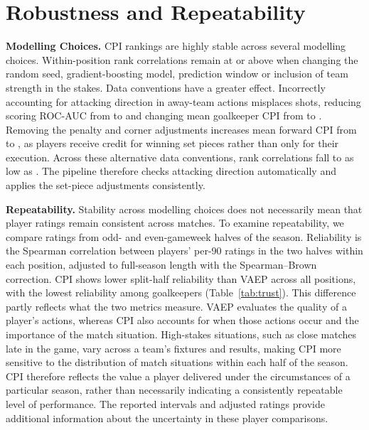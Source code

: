 \documentclass[runningheads]{llncs}
\begin{document}
\section{Robustness and Repeatability}
\label{sec:robust}
\noindent\textbf{Modelling Choices.} CPI rankings are highly stable across several modelling choices. Within-position rank correlations remain at or above \sensRhoMin{} when changing the random seed, gradient-boosting model, prediction window or inclusion of team strength in the stakes. Data conventions have a greater effect. Incorrectly accounting for attacking direction in away-team actions misplaces shots, reducing scoring ROC-AUC from \baseAuc{} to \mirrorAuc{} and changing mean goalkeeper CPI from \baseKeeper{} to \mirrorKeeper{}. Removing the penalty and corner adjustments increases mean forward CPI from \baseForward{} to \noBaseForward{}, as players receive credit for winning set pieces rather than only for their execution. Across these alternative data conventions, rank correlations fall to as low as \choiceRhoMin{}. The pipeline therefore checks attacking direction automatically and applies the set-piece adjustments consistently.

\textbf{Repeatability.} Stability across modelling choices does not necessarily mean that player ratings remain consistent across matches. To examine repeatability, we compare ratings from odd- and even-gameweek halves of the season. Reliability is the Spearman correlation between players' per-90 ratings in the two halves within each position, adjusted to full-season length with the Spearman--Brown correction. CPI shows lower split-half reliability than VAEP across all positions, with the lowest reliability among goalkeepers (Table~\ref{tab:trust}). This difference partly reflects what the two metrics measure. VAEP evaluates the quality of a player's actions, whereas CPI also accounts for when those actions occur and the importance of the match situation. High-stakes situations, such as close matches late in the game, vary across a team's fixtures and results, making CPI more sensitive to the distribution of match situations within each half of the season. CPI therefore reflects the value a player delivered under the circumstances of a particular season, rather than necessarily indicating a consistently repeatable level of performance. The reported intervals and adjusted ratings provide additional information about the uncertainty in these player comparisons.
\end{document}
